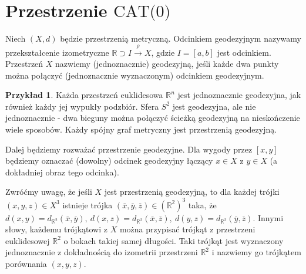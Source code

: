\documentclass[licencjacka]{pracamgr}
\theoremstyle{definition}
\theoremstyle{definition}
\theoremstyle{definition}
\theoremstyle{definition}
\newtheorem{example}{Przykład}[section]
\theoremstyle{definition}
\theoremstyle{plain}
\theoremstyle{plain}
\begin{document}
\section{Przestrzenie $\text{CAT(0)}$}
Niech $ (X, d) $ będzie przestrzenią metryczną. Odcinkiem geodezyjnym nazywamy 
przekształcenie izometryczne $ \mathbb{R} \supset I \xrightarrow{\rho} X $, gdzie 
$ I =[a,b]$ jest odcinkiem. Przestrzeń $ X $ nazwiemy (jednoznacznie) geodezyjną, 
jeśli każde dwa punkty można połączyć (jednoznacznie wyznaczonym) odcinkiem 
geodezyjnym.

\begin{example}
	Każda przestrzeń euklidesowa $ \mathbb{R}^n $ jest jednoznacznie geodezyjna, 
	jak również każdy jej wypukły podzbiór. Sfera $ S^2 $ jest geodezyjna, ale 
	nie jednoznacznie - dwa bieguny można połączyć ścieżką geodezyjną na 
	nieskończenie wiele sposobów. Każdy spójny graf metryczny jest przestrzenią 
	geodezyjną.
\end{example}

Dalej będziemy rozważać przestrzenie geodezyjne. Dla wygody przez $ [x,y] $ będziemy 
oznaczać (dowolny) odcinek geodezyjny łączący $ x \in X$ z $ y \in X $ (a dokładniej 
obraz tego odcinka).

Zwróćmy uwagę, że jeśli $ X $ jest przestrzenią geodezyjną, to dla każdej trójki 
$ (x,y,z) \in X^3 $ istnieje trójka $ (\overline{x},\overline{y}, \overline{z}) 
\in \left(\mathbb{R}^2\right)^3$ taka, że $ d(x,y) = d_{\mathbb{R}^2} (\overline{x}, 
\overline{y}), ~ d(x,z) = d_{\mathbb{R}^2} (\overline{x}, \overline{z}), 
~ d(y,z) = d_{\mathbb{R}^2} (\overline{y}, \overline{z})  $. Innymi słowy, każdemu 
trójkątowi z $ X $ można przypisać trójkąt z przestrzeni euklidesowej $ \mathbb{R}^2 $ o 
bokach takiej samej długości. Taki trójkąt jest wyznaczony jednoznacznie z dokładnością 
do izometrii przestrzeni $ \mathbb{R}^2 $ i nazwiemy go trójkątem porównania $ (x,y,z) $.
\end{document}
